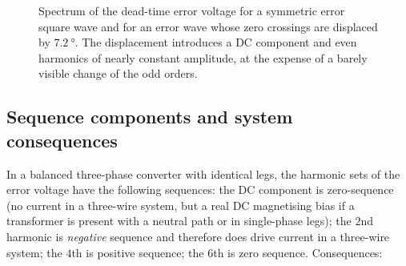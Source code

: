 \documentclass[11pt,a4paper]{article}
\begin{document}
\begin{figure}[htb]
\centering
{}
\caption{Spectrum of the dead-time error voltage for a symmetric error square wave and for
an error wave whose zero crossings are displaced by $\SI{7.2}{\degree}$. The displacement
introduces a DC component and even harmonics of nearly constant amplitude, at the expense
of a barely visible change of the odd orders.}
\label{fig:spectrum}
\end{figure}

\subsection{Sequence components and system consequences}

In a balanced three-phase converter with identical legs, the harmonic sets of the error
voltage have the following sequences: the DC component is zero-sequence (no current in a
three-wire system, but a real DC magnetising bias if a transformer is present with a
neutral path or in single-phase legs); the $2$nd harmonic is \emph{negative} sequence and
therefore does drive current in a three-wire system; the $4$th is positive sequence; the
$6$th is zero sequence. Consequences:
\end{document}
